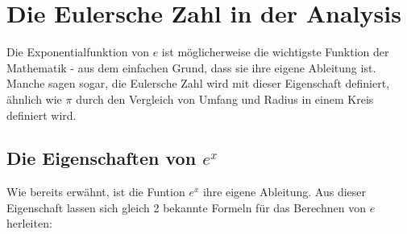 \section{Die Eulersche Zahl in der Analysis} Die Exponentialfunktion von $e$ ist möglicherweise die wichtigste Funktion der Mathematik - aus dem einfachen Grund, dass sie ihre eigene Ableitung ist. Manche sagen sogar, die Eulersche Zahl wird mit dieser Eigenschaft definiert, ähnlich wie $\pi$ durch den Vergleich von Umfang und Radius in einem Kreis definiert wird.
\subsection{Die Eigenschaften von $e^x$}
Wie bereits erwähnt, ist die Funtion $e^x$ ihre eigene Ableitung. Aus dieser Eigenschaft lassen sich gleich 2 bekannte Formeln für das Berechnen von $e$ herleiten:
